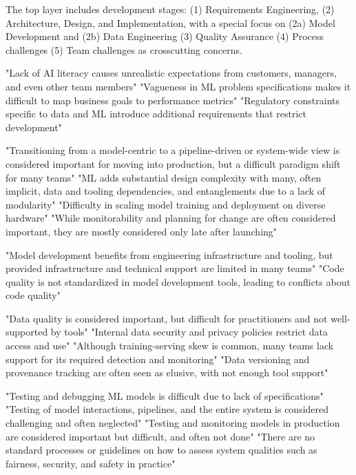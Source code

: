 The top layer includes development stages:
(1) Requirements Engineering,
(2) Architecture, Design, and Implementation, with a special focus on
    (2a) Model Development and (2b) Data Engineering
(3) Quality Assurance
(4) Process challenges
(5) Team challenges as crosscutting concerns.

"Lack of AI literacy causes unrealistic expectations from customers, managers,
and even other team members"
"Vagueness in ML problem specifications makes it difficult to map business goals
to performance metrics"
"Regulatory constraints specific to data and ML introduce additional requirements
that restrict development"

"Transitioning from a model-centric to a pipeline-driven or system-wide view is
considered important for moving into production, but a difficult paradigm shift
for many teams"
"ML adds substantial design complexity with many, often implicit, data and
tooling dependencies, and entanglements due to a lack of modularity"
"Difficulty in scaling model training and deployment on diverse hardware"
"While monitorability and planning for change are often considered important,
they are mostly considered only late after launching"

"Model development benefits from engineering infrastructure and tooling, but
provided infrastructure and technical support are limited in many teams"
"Code quality is not standardized in model development tools, leading to
conflicts about code quality"

"Data quality is considered important, but difficult for practitioners and not
well-supported by tools"
"Internal data security and privacy policies restrict data access and use"
"Although training-serving skew is common, many teams lack support for its
required detection and monitoring"
"Data versioning and provenance tracking are often seen as elusive, with not
enough tool support"

"Testing and debugging ML models is difficult due to lack of specifications"
"Testing of model interactions, pipelines, and the entire system is considered
challenging and often neglected"
"Testing and monitoring models in production are considered important but
difficult, and often not done"
"There are no standard processes or guidelines on how to assess system qualities
such as fairness, security, and safety in practice"

